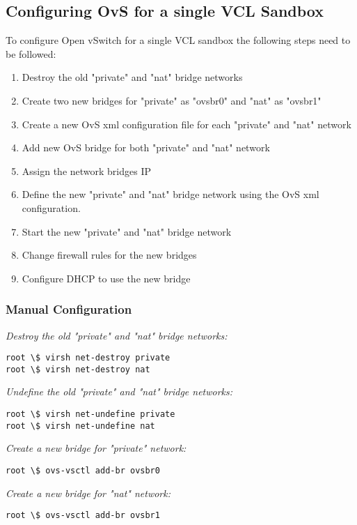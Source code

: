 \documentclass[12pt]{extarticle}
\begin{document}
\subsection{Configuring OvS for a single VCL Sandbox}
To configure Open vSwitch for a single VCL sandbox the following steps need to be followed: 
\begin{enumerate}
    \item Destroy the old "private" and "nat" bridge networks
    \item Create two new bridges for "private" as "ovsbr0" and "nat" as "ovsbr1"
    \item Create a new OvS xml configuration file for each "private" and "nat" network
    \item Add new OvS bridge for both "private" and "nat" network
    \item Assign the network bridges IP 
    \item Define the new "private" and "nat" bridge network using the OvS xml configuration. 
    \item Start the new "private" and "nat" bridge network
    \item Change firewall rules for the new bridges
    \item Configure DHCP to use the new bridge
\end{enumerate}
\subsubsection{Manual Configuration}
\noindent
\textit{Destroy the old "private" and "nat" bridge networks:}
\begin{verbatim}
root \$ virsh net-destroy private
root \$ virsh net-destroy nat
\end{verbatim}

\noindent
\textit{Undefine the old "private" and "nat" bridge networks:}
\begin{verbatim}
root \$ virsh net-undefine private
root \$ virsh net-undefine nat
\end{verbatim}

\noindent
\textit{Create a new bridge for "private" network:}
\begin{verbatim}
root \$ ovs-vsctl add-br ovsbr0
\end{verbatim}

\noindent
\textit{Create a new bridge for "nat" network:}
\begin{verbatim}
root \$ ovs-vsctl add-br ovsbr1
\end{verbatim}
\end{document}
